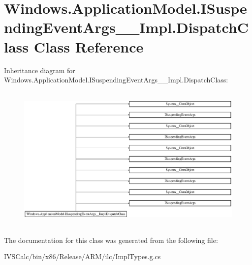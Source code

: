 \hypertarget{class_windows_1_1_application_model_1_1_i_suspending_event_args_____impl_1_1_dispatch_class}{}\section{Windows.\+Application\+Model.\+I\+Suspending\+Event\+Args\+\_\+\+\_\+\+Impl.\+Dispatch\+Class Class Reference}
\label{class_windows_1_1_application_model_1_1_i_suspending_event_args_____impl_1_1_dispatch_class}
Inheritance diagram for Windows.\+Application\+Model.\+I\+Suspending\+Event\+Args\+\_\+\+\_\+\+Impl.\+Dispatch\+Class\+:\begin{figure}[H]
\begin{center}
\leavevmode
\includegraphics[height=7.264151cm]{class_windows_1_1_application_model_1_1_i_suspending_event_args_____impl_1_1_dispatch_class}
\end{center}
\end{figure}


The documentation for this class was generated from the following file\+:\begin{DoxyCompactItemize}
\item 
I\+V\+S\+Calc/bin/x86/\+Release/\+A\+R\+M/ilc/Impl\+Types.\+g.\+cs\end{DoxyCompactItemize}
